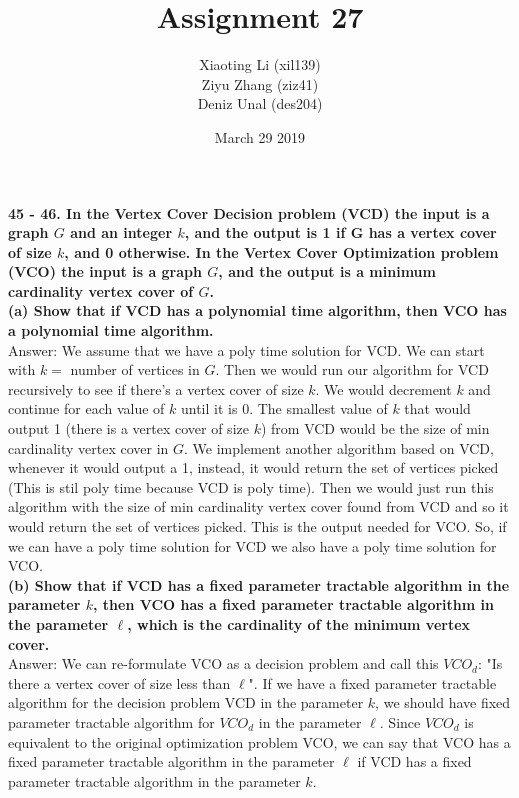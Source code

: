 \documentclass{article}
\title{Assignment 27}
\author{Xiaoting Li (xil139) \\
Ziyu Zhang (ziz41) \\
Deniz Unal (des204)}
\date{March 29 2019}
\begin{document}
\maketitle
\noindent
\textbf{45 - 46. In the Vertex Cover Decision problem (VCD) the input is a graph $G$ and an integer $k$, and the output is 1 if G has a vertex cover of size $k$, and 0 otherwise. In the Vertex Cover Optimization problem (VCO) the input is a graph $G$, and the output is a minimum cardinality vertex cover of $G$.} \\ \newline
\textbf{(a) Show that if VCD has a polynomial time algorithm, then VCO has a polynomial time algorithm.} \\ \newline
Answer: We assume that we have a poly time solution for VCD. We can start with $k =$ number of vertices in $G$. Then we would run our algorithm for VCD recursively to see if there's a vertex cover of size $k$. We would decrement $k$ and continue for each value of $k$ until it is 0. The smallest value of $k$ that would output 1 (there is a vertex cover of size $k$) from VCD would be the size of min cardinality vertex cover in $G$. We implement another algorithm based on VCD, whenever it would output a 1, instead, it would return the set of vertices picked (This is stil poly time because VCD is poly time). Then we would just run this algorithm with the size of min cardinality vertex cover found from VCD and so it would return the set of vertices picked. This is the output needed for VCO. So, if we can have a poly time solution for VCD we also have a poly time solution for VCO.\\ \newline
\textbf{(b) Show that if VCD has a fixed parameter tractable algorithm in the parameter $k$, then VCO has a fixed parameter tractable algorithm in the parameter $\ell$, which is the cardinality of the minimum vertex cover.} \\ \newline
Answer: We can re-formulate VCO as a decision problem and call this $VCO_d$: "Is there a vertex cover of size less than $\ell$".  If we have a fixed parameter tractable algorithm for the decision problem VCD in the parameter $k$, we should have fixed parameter tractable algorithm for $VCO_d$ in the parameter $\ell$. Since $VCO_d$ is equivalent to the original optimization problem VCO, we can say that VCO has a fixed parameter tractable algorithm in the parameter $\ell$ if VCD has a fixed parameter tractable algorithm in the parameter $k$.\\ \newline
\end{document}
